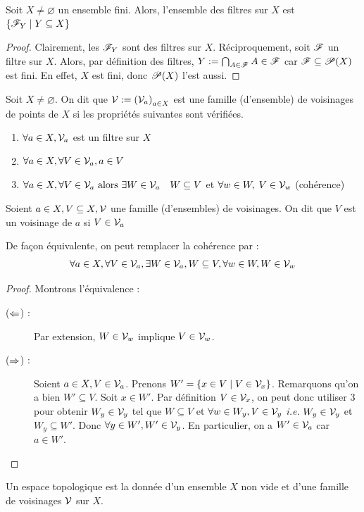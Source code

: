 \begin{proposition}
    Soit $X\ne\varnothing$ un ensemble fini. Alors, l'ensemble des filtres sur $X$ est $\{\mathscr{F}_Y\mid Y\subseteq X\}$ 
\end{proposition}
\begin{proof}
    Clairement, les $\mathscr{F}_Y$ sont des filtres sur $X$. Réciproquement, soit $\mathscr{F}$ un filtre sur $X$. Alors, par définition des filtres, $Y:=\bigcap_{A\in\mathscr{F}}A\in\mathscr{F}$ car $\mathscr{F}\subseteq\mathscr{P}(X)$ est fini. En effet, $X$ est fini, donc $\mathscr{P}(X)$ l'est aussi. 
\end{proof}

\begin{definition}
    Soit $X\neq \varnothing$. On dit que $\mathcal{V}:=\left(\mathcal{V}_a\right)_{a\in X}$ est une famille (d'ensemble) de voisinages de points de $X$ si les propriétés suivantes sont vérifiées.    
    \begin{enumerate}
        \item $\forall a\in X, \mathcal{V}_a$ est un filtre sur $X$
        \item $\forall a \in X,\forall V\in\mathcal{V}_a, a\in V $
        \item  $\forall a\in X,\forall V\in \mathcal{V}_a\text{ alors }\exists W\in \mathcal{V}_a\quad W\subseteq V$ et $\forall w\in W,\; V\in \mathcal{V}_w$ (cohérence)
    \end{enumerate}
\end{definition}
\begin{notation}
    Soient $a\in X, V\subseteq X,\mathcal{V}$ une famille (d'ensembles) de voisinages. On dit que $V$ est un voisinage de $a$ si $V\in\mathcal{V}_a$
\end{notation}
\begin{proposition}
De façon équivalente, on peut remplacer la cohérence par :
$$\forall a\in X,\forall V\in \mathcal{V}_a, \exists W\in \mathcal{V}_a , W\subseteq V, \forall w\in W, W\in \mathcal{V}_w$$  
\end{proposition}
\begin{proof}
    Montrons l'équivalence :
    \begin{description}
    \item[($\Leftarrow$) : ]Par extension, $W\in\mathcal{V}_w$ implique $V\in\mathcal{V}_w$.
        \item[($\Rightarrow$) : ]Soient $a\in X,V\in\mathcal{V}_a$. Prenons $W'=\{x\in V\mid V\in\mathcal{V}_x\}$. Remarquons qu'on a bien $W'\subseteq V$. Soit $x\in W'$. Par définition $V\in\mathcal{V}_x$, on peut donc utiliser $3$ pour obtenir $W_y\in\mathcal{V}_y$ tel que $W\subseteq V$ et $\forall w\in W_y,V\in \mathcal{V}_y$ \textit{i.e.} $W_y\in\mathcal{V}_y$ et $W_y\subseteq W'$. Donc $\forall y\in W',W'\in\mathcal{V}_y$. En particulier, on a $W'\in\mathcal{V}_a$ car $a\in W'$.
    \end{description}
\end{proof}
\begin{definition}
Un espace topologique est la donnée d'un ensemble $X$ non vide et d'une famille de voisinages $\mathcal{V}$ sur $X$.
\end{definition}


